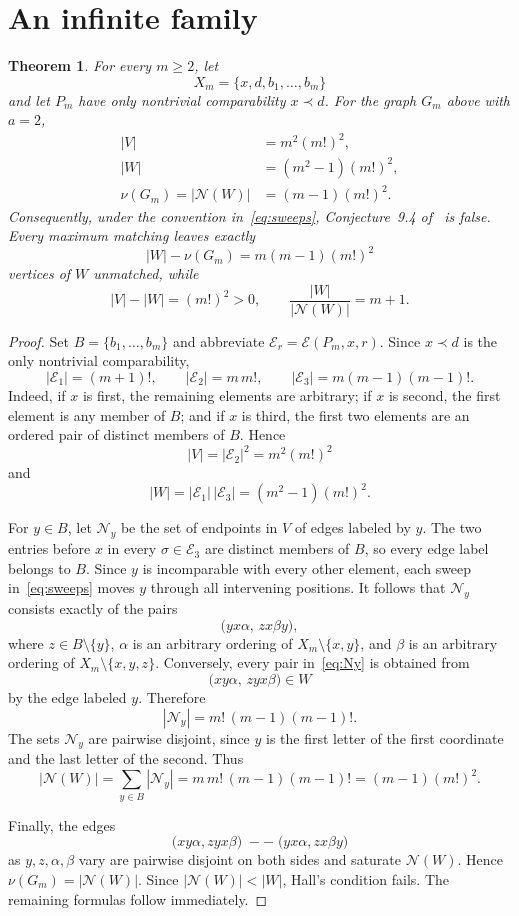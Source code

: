 \documentclass[11pt]{amsart}
\newtheorem{theorem}{Theorem}
\newcommand{\cE}{\mathcal E}
\newcommand{\cN}{\mathcal N}
\begin{document}
\section{An infinite family}

\begin{theorem}\label{thm:main}
For every $m\ge2$, let
\[
 X_m=\{x,d,b_1,\ldots,b_m\}
\]
and let $P_m$ have only nontrivial comparability $x\prec d$. For the graph
$G_m$ above with $a=2$,
\begin{align*}
 |V|&=m^2(m!)^2,\\
 |W|&=(m^2-1)(m!)^2,\\
 \nu(G_m)=|\cN(W)|&=(m-1)(m!)^2.
\end{align*}
Consequently, under the convention in~\eqref{eq:sweeps},
Conjecture~9.4 of~\cite{CPP23} is false. Every maximum matching leaves
exactly
\[
 |W|-\nu(G_m)=m(m-1)(m!)^2
\]
vertices of $W$ unmatched, while
\[
 |V|-|W|=(m!)^2>0,
 \qquad
 \frac{|W|}{|\cN(W)|}=m+1.
\]
\end{theorem}

\begin{proof}
Set $B=\{b_1,\ldots,b_m\}$ and abbreviate
$\cE_r=\cE(P_m,x,r)$. Since $x\prec d$ is the only nontrivial
comparability,
\[
 |\cE_1|=(m+1)!,
 \qquad
 |\cE_2|=m\,m!,
 \qquad
 |\cE_3|=m(m-1)(m-1)!.
\]
Indeed, if $x$ is first, the remaining elements are arbitrary; if $x$ is
second, the first element is any member of $B$; and if $x$ is third, the
first two elements are an ordered pair of distinct members of $B$. Hence
\[
 |V|=|\cE_2|^2=m^2(m!)^2
\]
and
\[
 |W|=|\cE_1|\,|\cE_3|=(m^2-1)(m!)^2.
\]

For $y\in B$, let $\cN_y$ be the set of endpoints in $V$ of edges labeled by
$y$. The two entries before $x$ in every $\sigma\in\cE_3$ are distinct
members of $B$, so every edge label belongs to $B$. Since $y$ is incomparable
with every other element, each sweep in~\eqref{eq:sweeps} moves $y$ through
all intervening positions. It follows that $\cN_y$ consists exactly of the
pairs
\begin{equation}\label{eq:Ny}
 \bigl(yx\alpha,\,zx\beta y\bigr),
\end{equation}
where $z\in B\setminus\{y\}$, $\alpha$ is an arbitrary ordering of
$X_m\setminus\{x,y\}$, and $\beta$ is an arbitrary ordering of
$X_m\setminus\{x,y,z\}$. Conversely, every pair in~\eqref{eq:Ny} is obtained
from
\[
 \bigl(xy\alpha,\,zyx\beta\bigr)\in W
\]
by the edge labeled $y$. Therefore
\[
 |\cN_y|=m!\,(m-1)(m-1)!.
\]
The sets $\cN_y$ are pairwise disjoint, since $y$ is the first letter of the
first coordinate and the last letter of the second. Thus
\[
 |\cN(W)|
 =\sum_{y\in B}|\cN_y|
 =m\,m!\,(m-1)(m-1)!
 =(m-1)(m!)^2.
\]

Finally, the edges
\[
 \bigl(xy\alpha,zyx\beta\bigr)
 \;--\;
 \bigl(yx\alpha,zx\beta y\bigr)
\]
as $y,z,\alpha,\beta$ vary are pairwise disjoint on both sides and saturate
$\cN(W)$. Hence $\nu(G_m)=|\cN(W)|$. Since $|\cN(W)|<|W|$, Hall's condition
fails. The remaining formulas follow immediately.
\end{proof}
\end{document}

